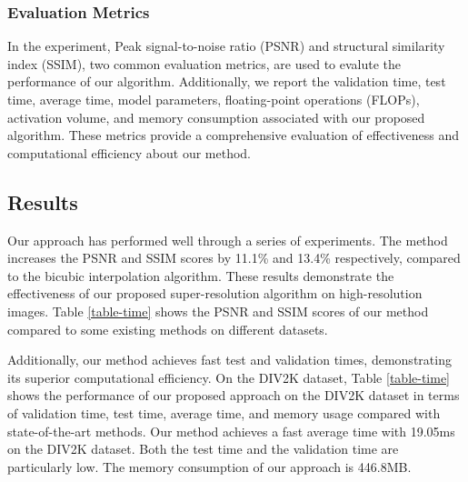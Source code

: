 \documentclass[10pt,twocolumn,letterpaper]{article}
\begin{document}
\subsubsection{Evaluation Metrics}
In the experiment, Peak signal-to-noise ratio (PSNR) and structural similarity index (SSIM), two common evaluation metrics, are used to evalute the performance of our algorithm.  
Additionally, we report the validation time, test time, average time, model parameters, floating-point operations (FLOPs), activation volume, and memory consumption associated with our proposed algorithm. These metrics provide a comprehensive evaluation of effectiveness and computational efficiency about our method.

\subsection{Results}
Our approach has performed well through a series of experiments. The method increases the PSNR and SSIM scores by 11.1\% and 13.4\% respectively, compared to the bicubic interpolation algorithm. These results demonstrate the effectiveness of our proposed super-resolution algorithm on high-resolution images. Table \ref{table-time} shows the PSNR and SSIM scores of our method compared to some existing methods on different datasets.

Additionally, our method achieves fast test and validation times, demonstrating its superior computational efficiency. On the DIV2K dataset, Table \ref{table-time} shows the performance of our proposed approach on the DIV2K dataset in terms of validation time, test time, average time, and memory usage compared with state-of-the-art methods. Our method achieves a fast average time with 19.05ms on the DIV2K dataset. Both the test time and the validation time are particularly low. The memory consumption of our approach is 446.8MB.

\begin{table}[h]
  \centering
  \caption{Compared with the bicubic method, our method can effectively improve the image quality.}
  \label{tab:example}
\end{table}
\end{document}
